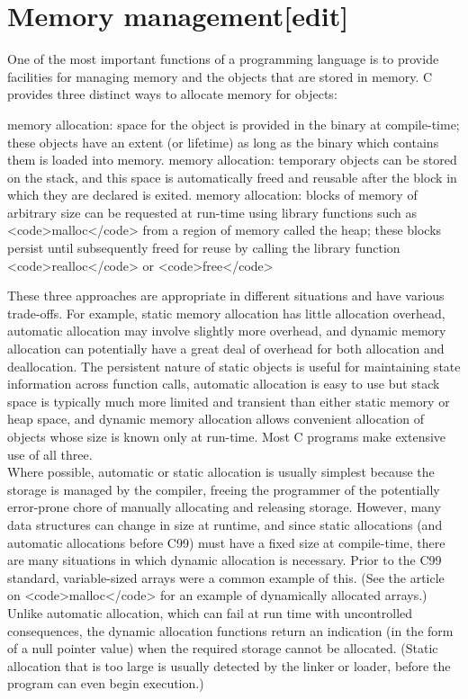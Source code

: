 \documentclass{article}\usepackage{titlesec}
\begin{document}
\section{Memory management[edit]}
One of the most important functions of a programming language is to provide facilities for managing memory and the objects that are stored in memory. C provides three distinct ways to allocate memory for objects:
\\

\begin{itemize}\itemStatic memory allocation: space for the object is provided in the binary at compile-time; these objects have an extent (or lifetime) as long as the binary which contains them is loaded into memory.
\itemAutomatic memory allocation: temporary objects can be stored on the stack, and this space is automatically freed and reusable after the block in which they are declared is exited.
\itemDynamic memory allocation: blocks of memory of arbitrary size can be requested at run-time using library functions such as <code>malloc</code> from a region of memory called the heap; these blocks persist until subsequently freed for reuse by calling the library function <code>realloc</code> or <code>free</code>\end{itemize}
These three approaches are appropriate in different situations and have various trade-offs. For example, static memory allocation has little allocation overhead, automatic allocation may involve slightly more overhead, and dynamic memory allocation can potentially have a great deal of overhead for both allocation and deallocation. The persistent nature of static objects is useful for maintaining state information across function calls, automatic allocation is easy to use but stack space is typically much more limited and transient than either static memory or heap space, and dynamic memory allocation allows convenient allocation of objects whose size is known only at run-time. Most C programs make extensive use of all three.
\\
Where possible, automatic or static allocation is usually simplest because the storage is managed by the compiler, freeing the programmer of the potentially error-prone chore of manually allocating and releasing storage. However, many data structures can change in size at runtime, and since static allocations (and automatic allocations before C99) must have a fixed size at compile-time, there are many situations in which dynamic allocation is necessary.  Prior to the C99 standard, variable-sized arrays were a common example of this. (See the article on <code>malloc</code> for an example of dynamically allocated arrays.) Unlike automatic allocation, which can fail at run time with uncontrolled consequences, the dynamic allocation functions return an indication (in the form of a null pointer value) when the required storage cannot be allocated.  (Static allocation that is too large is usually detected by the linker or loader, before the program can even begin execution.)
\end{document}
